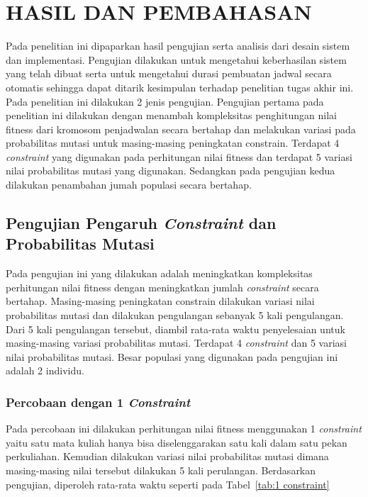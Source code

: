 \chapter{HASIL DAN PEMBAHASAN}
\label{chap:hasilpembahasan}

Pada penelitian ini dipaparkan hasil pengujian serta analisis dari desain sistem dan implementasi. 
Pengujian dilakukan untuk mengetahui keberhasilan sistem yang telah dibuat serta untuk mengetahui durasi pembuatan jadwal secara otomatis sehingga dapat ditarik kesimpulan terhadap penelitian tugas akhir ini. 
Pada penelitian ini dilakukan 2 jenis pengujian. 
Pengujian pertama pada penelitian ini dilakukan dengan menambah kompleksitas penghitungan nilai fitness dari kromosom penjadwalan secara bertahap dan melakukan variasi pada probabilitas mutasi untuk masing-masing peningkatan constrain.
Terdapat 4 \textit{constraint} yang digunakan pada perhitungan nilai fitness dan terdapat 5 variasi nilai probabilitas mutasi yang digunakan.
Sedangkan pada pengujian kedua dilakukan penambahan jumah populasi secara bertahap.

\section{Pengujian Pengaruh \textit{Constraint} dan Probabilitas Mutasi}
Pada pengujian ini yang dilakukan adalah meningkatkan kompleksitas perhitungan nilai fitness dengan meningkatkan jumlah \textit{constraint} secara bertahap. 
Masing-masing peningkatan constrain dilakukan variasi nilai probabilitas mutasi dan dilakukan pengulangan sebanyak 5 kali pengulangan.
Dari 5 kali pengulangan tersebut, diambil rata-rata waktu penyelesaian untuk masing-masing variasi probabilitas mutasi.
Terdapat 4 \textit{constraint} dan 5 variasi nilai probabilitas mutasi. Besar populasi yang digunakan pada pengujian ini adalah 2 individu.
\subsection{Percobaan dengan 1 \textit{Constraint}}
\label{sec:pengujian 1}
  Pada percobaan ini dilakukan perhitungan nilai fitness menggunakan 1 \textit{constraint} yaitu satu mata kuliah hanya bisa diselenggarakan satu kali dalam satu pekan perkuliahan.
  Kemudian dilakukan variasi nilai probabilitas mutasi dimana masing-masing nilai tersebut dilakukan 5 kali perulangan. 
  Berdasarkan pengujian, diperoleh rata-rata waktu seperti pada Tabel~\ref{tab:1 constraint}
  
